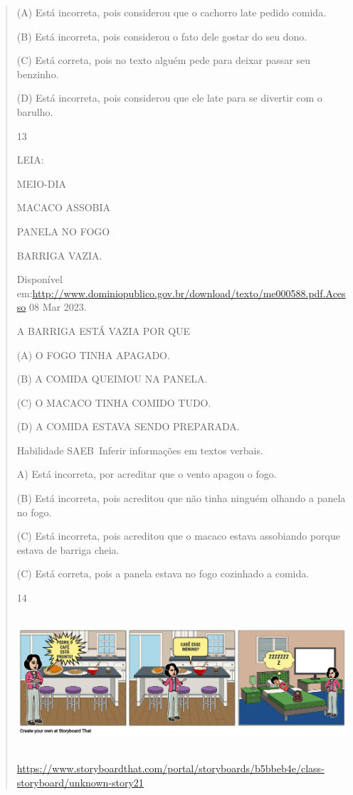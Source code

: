 {{{{\begin{verse}
{{\begin{escolha}
{{{{{(A) Está incorreta, pois considerou que o cachorro late pedido comida.

(B) Está incorreta, pois considerou o fato dele gostar do seu dono.

(C) Está correta, pois no texto alguém pede para deixar passar seu
benzinho.

(D) Está incorreta, pois considerou que ele late para se divertir com o
barulho.

\num{13}

LEIA:

MEIO-DIA

MACACO ASSOBIA

PANELA NO FOGO

BARRIGA VAZIA.

Disponível
em:\url{http://www.dominiopublico.gov.br/download/texto/me000588.pdf.Acesso}
08 Mar 2023.

A BARRIGA ESTÁ VAZIA POR QUE

(A) O FOGO TINHA APAGADO.

(B) A COMIDA QUEIMOU NA PANELA.

(C) O MACACO TINHA COMIDO TUDO.

(D) A COMIDA ESTAVA SENDO PREPARADA.

Habilidade SAEB~Inferir informações em textos verbais.

A) Está incorreta, por acreditar que o vento apagou o fogo.

(B) Está incorreta, pois acreditou que não tinha ninguém olhando a
panela no fogo.

(C) Está incorreta, pois acreditou que o macaco estava assobiando porque
estava de barriga cheia.

(C) Está correta, pois a panela estava no fogo cozinhado a comida.

\num{14}

\includegraphics[width=5.90556in,height=1.95556in]{media/image146.png}

\url{https://www.storyboardthat.com/portal/storyboards/b5bbeb4e/class-storyboard/unknown-story21}

}}}}}
\end{escolha}}}
\end{verse}}}}}
